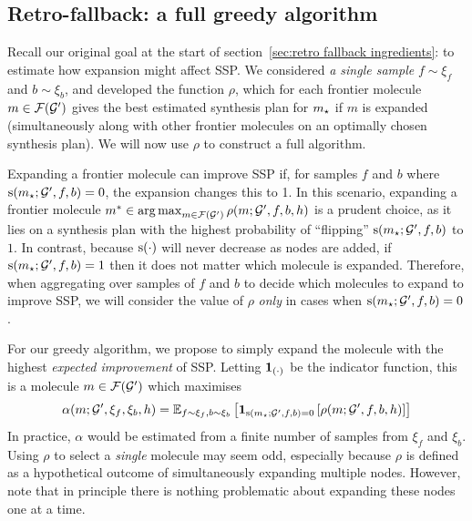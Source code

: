 \subsection{Retro-fallback: a full greedy algorithm}
\label{ssec:retro-fallback algorithm}

Recall our original goal at the start of section~\ref{sec:retro fallback ingredients}:
to estimate how expansion might affect SSP.
We considered \emph{a single sample} $f\sim\xi_f$ and $b\sim\xi_b$,
and developed the function $\rho$,
which for each frontier
molecule $m\in\mathcal{F}({\mathcal{G}}')$ gives the best estimated synthesis plan for $m_\star$
if $m$ is expanded
(simultaneously along with other frontier molecules on an optimally chosen synthesis plan).
We will now use $\rho$ to construct a full algorithm.

Expanding a frontier molecule can improve SSP if, for samples $f$ and $b$
where \\ ${\textnormal{s}}(m_\star;{\mathcal{G}}',f,b)=0$,
the expansion changes this to 1.
In this scenario, expanding a frontier molecule
$m^*\in\operatorname*{arg\,max}_{m\in\mathcal{F}({\mathcal{G}}')}\rho(m;{\mathcal{G}}',f,b,h)$
is a prudent choice,
as it lies on a synthesis plan with the highest probability
of ``flipping'' ${\textnormal{s}}(m_\star;{\mathcal{G}}',f,b)$ to $1$.
In contrast, because ${\textnormal{s}}(\cdot)$ will never decrease as nodes are added,
if ${\textnormal{s}}(m_\star;{\mathcal{G}}',f,b)=1$ then it does not matter which molecule is expanded.
Therefore, when aggregating over samples of $f$ and $b$ to decide which molecules to expand to improve SSP,
we will consider the value of $\rho$ \emph{only} in cases when ${\textnormal{s}}(m_\star;{\mathcal{G}}',f,b)=0$.


For our greedy algorithm,
we propose to simply expand the molecule with the highest \emph{expected improvement}
of SSP.
Letting $\bm{1}_{(\cdot)}$ be the indicator function,
this is a molecule
$m\in\mathcal{F}({\mathcal{G}}')$ which maximises
\begin{equation}\label{eqn:retro fallback alpha}
    \alpha(m;{\mathcal{G}}',\xi_f,\xi_b, h) = \mathbb{E}_{f\sim \xi_f, b\sim \xi_b}\left[
        \bm{1}_{{\textnormal{s}}(m_\star;{\mathcal{G}}',f,b)=0}\left[\rho(m;{\mathcal{G}}',f,b,h)\right]
    \right]
\end{equation}
In practice, $\alpha$ would be estimated from a finite number of samples from $\xi_f$ and $\xi_b$.
Using $\rho$ to select a \emph{single} molecule may seem odd,
especially because $\rho$ is defined as a hypothetical outcome of simultaneously expanding multiple nodes.
However, note that in principle there is nothing problematic about expanding these nodes one at a time.

